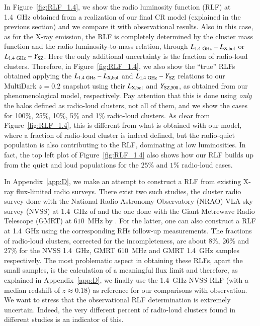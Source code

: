 \documentclass[traditabstract]{aa}
\newcommand{\rmn}{\mathrm}
\begin{document}
In Figure~\ref{fig:RLF_1.4}, we show the radio luminosity function (RLF) at 1.4~GHz obtained from a realization of our final CR model (explained in the previous section) and we compare it with observational results. Also in this case, as for the X-ray emission, the RLF is completely determined by the cluster mass function and the radio luminosity-to-mass relation, through $L_{1.4~\rmn{GHz}}-L_{ \rm{X,bol}}$ or $L_{1.4~\rmn{GHz}}-Y_{\rm{SZ}}$. Here the only additional uncertainty is the fraction of radio-loud clusters. Therefore, in Figure~\ref{fig:RLF_1.4}, we also show the ``true'' RLFs obtained applying  the $L_{1.4~\rmn{GHz}}-L_{\rm{X,bol}}$ and $L_{1.4~\rmn{GHz}}-Y_{\rm{SZ}}$ relations to our MultiDark $z = 0.2$ snapshot using their $L_{\rm{X,bol}}$ and $Y_{\rm{SZ}, 500}$, as obtained from our phenomenological model, respectively. Pay attention that this is done using \emph{only} the halos defined as radio-loud clusters, not all of them, and we show the cases for 100\%, 25\%, 10\%, 5\% and 1\% radio-loud clusters. As clear from Figure~\ref{fig:RLF_1.4}, this is different from what is obtained with our model, where a fraction of radio-loud cluster is indeed defined, but the radio-quiet population is also contributing to the RLF, dominating at low luminosities. In fact, the top left plot of Figure~\ref{fig:RLF_1.4} also shows how our RLF builds up from the quiet and loud populations for the $25\%$ and $1\%$ radio-loud cases.

In Appendix~\ref{app:D}, we make an attempt to construct a RLF from existing X-ray flux-limited radio surveys. There exist two such studies, the cluster radio survey done with the National Radio Astronomy Observatory (NRAO) VLA sky survey (NVSS) at $1.4$~GHz of \cite{1999NewA....4..141G} and the one done with the Giant Metrewave Radio Telescope (GMRT) at $610$~MHz by \cite{VenturiGMRT_1,VenturiGMRT_2}. For the latter, one can also construct a RLF at 1.4~GHz using the corresponding RHs follow-up measurements. The fractions of radio-loud clusters, corrected for the incompleteness, are about 8\%, 26\% and 27\% for the NVSS 1.4~GHz, GMRT 610~MHz and GMRT 1.4~GHz samples respectively. The most problematic aspect in obtaining these RLFs, apart the small samples, is the calculation of a meaningful flux limit and therefore, as explained in Appendix~\ref{app:D}, we finally use the 1.4~GHz NVSS RLF (with a median redshift of $z \approx 0.18$) as reference for our comparisons with observation. We want to stress that the observational RLF determination is extremely uncertain. Indeed, the very different percent of radio-loud clusters found in different studies is an indicator of this.
 
\end{document}
